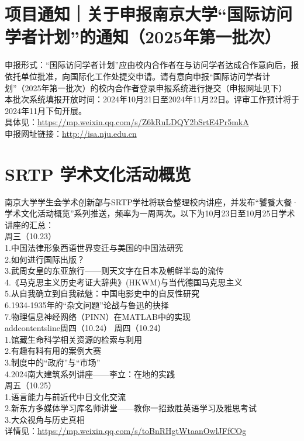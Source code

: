 \documentclass[letterpaper, 12pt]{article}
\begin{document}
\begin{multicols}{2}
\section{项目通知｜关于申报南京大学“国际访问学者计划”的通知（2025年第一批次）}
申报形式：“国际访问学者计划”应由校内合作者在与访问学者达成合作意向后，报依托单位批准，向国际化工作处提交申请。请有意向申报“国际访问学者计划”（2025年第一批次）的校内合作者登录申报系统进行提交（申报网址见下）\\
本批次系统填报开放时间：2024年10月21日至2024年11月22日。评审工作预计将于2024年11月下旬开展。\\
具体见：\url{https://mp.weixin.qq.com/s/Z6kRuLDQY2bSrtE4Pr5mkA}\\
申报网址链接：\url{http://isa.nju.edu.cn}\\
\section{SRTP  学术文化活动概览}
南京大学学生会学术创新部与SRTP学社将联合整理校内讲座，并发布“饕餮大餐·学术文化活动概览”系列推送，频率为一周两次。以下为10月23日至10月25日学术讲座的汇总：\\
周三（10.23）\\
1.中国法律形象西语世界变迁与美国的中国法研究\\
2.如何进行国际出版？\\
3.武周女皇的东亚旅行——则天文字在日本及朝鲜半岛的流传\\
4.《马克思主义历史考证大辞典》(HKWM)与当代德国马克思主义\\
5.从自我确立到自我祛魅：中国电影史中的自反性研究\\
6.1934-1935年的“杂文问题”论战与鲁迅的抉择\\
7.物理信息神经网络（PINN）在MATLAB中的实现\\addcontentsline{周四（10.24）
周四（10.24）\\
1.馆藏生命科学相关资源的检索与利用\\
2.有趣有料有用的案例大赛\\
3.制度中的“政府”与“市场”\\
4.2024南大建筑系列讲座——李立：在地的实践\\
周五（10.25）\\
1.语言能力与前近代中日文化交流\\
2.新东方多媒体学习库名师讲堂——教你一招致胜英语学习及雅思考试\\
3.大众视角与历史真相\\
详情见：\url{https://mp.weixin.qq.com/s/toBnRHgtWtaanOwlJFfCOg}\\
}
\end{multicols}
\end{document}
